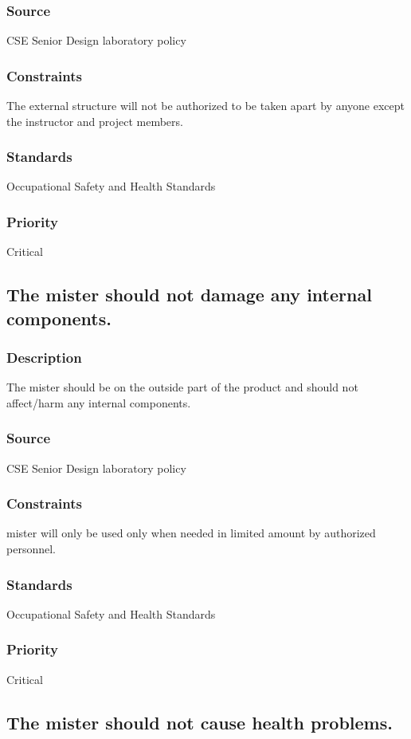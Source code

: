 \subsubsection{Source}
CSE Senior Design laboratory policy
\subsubsection{Constraints}
The external structure will not be authorized to be taken apart by anyone except the instructor and project members.
\subsubsection{Standards}
Occupational Safety and Health Standards
\subsubsection{Priority}
Critical

\subsection{The mister should not damage any internal components.}
\subsubsection{Description}
The mister should be on the outside part of the product and should not affect/harm any internal components.
\subsubsection{Source}
CSE Senior Design laboratory policy
\subsubsection{Constraints}
mister will only be used only when needed in limited amount by authorized personnel.
\subsubsection{Standards}
Occupational Safety and Health Standards
\subsubsection{Priority}
Critical

\subsection{The mister should not cause health problems.}
